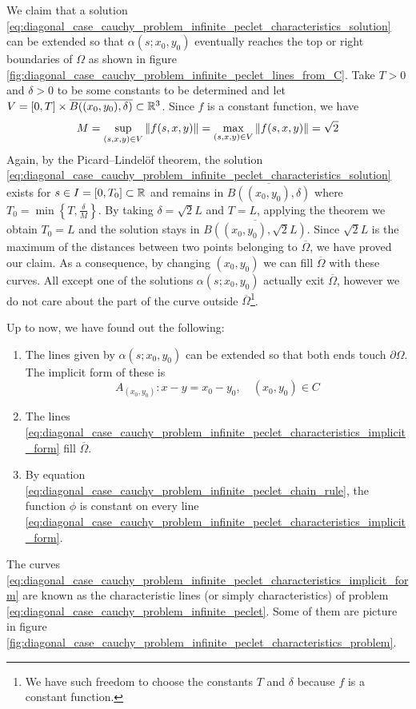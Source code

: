 We claim that a solution
\eqref{eq:diagonal_case_cauchy_problem_infinite_peclet_characteristics_solution}
can be extended so that $\alpha(s;x_0,y_0)$ eventually reaches the top or right
boundaries of $\Omega$ as shown in figure
\ref{fig:diagonal_case_cauchy_problem_infinite_peclet_lines_from_C}. Take $T >
0$ and $\delta > 0$ to be some constants to be determined and let $V = [0, T]
\times \overline{B((x_0,y_0), \delta)} \subset \mathbb{R}^3$. Since $f$ is a constant
function, we have
\begin{equation}
	M = 
	\sup_{(s,x,y) \in V} \norm{f(s,x,y)} = 
	\max_{(s,x,y) \in V} \norm{f(s,x,y)} = 
	\sqrt{2}
\end{equation} 
Again, by the Picard--Lindelöf theorem, the solution
\eqref{eq:diagonal_case_cauchy_problem_infinite_peclet_characteristics_solution}
exists for $s \in I = [0, T_0] \subset \mathbb{R}$ and remains in
$\overline{B((x_0,y_0), \delta)}$ where $T_0 = \min{\left\{ T, \frac{\delta}{M}
\right\}}$. By taking $\delta = \sqrt{2} L$ and $T = L$, applying the theorem we
obtain $T_0 = L$ and the solution stays in $\overline{B((x_0,y_0), \sqrt{2}
L)}$. Since $\sqrt{2} L$ is the maximum of the distances between two points
belonging to $\overline{\Omega}$, we have proved our claim. As a consequence, by
changing $(x_0,y_0)$ we can fill $\overline{\Omega}$ with these curves. All
except one of the solutions $\alpha(s;x_0,y_0)$ actually exit
$\overline{\Omega}$, however we do not care about the part of the curve outside
$\overline{\Omega}$\footnote{We have such freedom to choose the constants $T$
and $\delta$ because $f$ is a constant function.}.

Up to now, we have found out the following:
\begin{enumerate}[label={(\roman*)}, topsep=0pt]
	\item The lines given by $\alpha(s;x_0,y_0)$ can be extended so that both
	ends touch $\partial \Omega$. The implicit form of these is
	\begin{equation} \label{eq:diagonal_case_cauchy_problem_infinite_peclet_characteristics_implicit_form}
		A_{(x_0,y_0)} \colon x - y = x_0 - y_0, \quad (x_0,y_0) \in C
	\end{equation}
	\item The lines
	\eqref{eq:diagonal_case_cauchy_problem_infinite_peclet_characteristics_implicit_form}
	fill $\overline{\Omega}$.
	\item By equation
	\eqref{eq:diagonal_case_cauchy_problem_infinite_peclet_chain_rule}, the
	function $\phi$ is constant on every line
	\eqref{eq:diagonal_case_cauchy_problem_infinite_peclet_characteristics_implicit_form}.
	\label{eq:infinite_peclet_point_2}
\end{enumerate}
The curves
\eqref{eq:diagonal_case_cauchy_problem_infinite_peclet_characteristics_implicit_form}
are known as the characteristic lines (or simply characteristics) of problem
\eqref{eq:diagonal_case_cauchy_problem_infinite_peclet}. Some of them are
picture in figure
\ref{fig:diagonal_case_cauchy_problem_infinite_peclet_characteristics_problem}.

